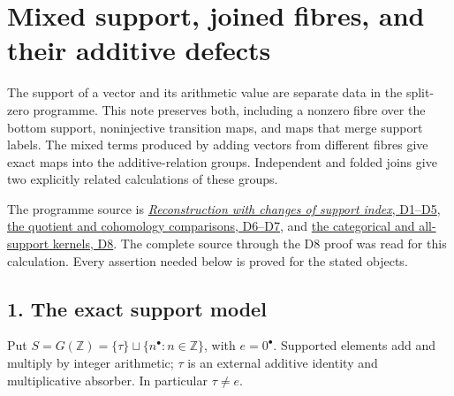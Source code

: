\documentclass[
]{article}
\author{}
\date{}
\begin{document}
{
\setcounter{tocdepth}{3}
\tableofcontents
}
\section{Mixed support, joined fibres, and their additive
defects}\label{mixed-support-joined-fibres-and-their-additive-defects}

The support of a vector and its arithmetic value are separate data in
the split-zero programme. This note preserves both, including a nonzero
fibre over the bottom support, noninjective transition maps, and maps
that merge support labels. The mixed terms produced by adding vectors
from different fibres give exact maps into the additive-relation groups.
Independent and folded joins give two explicitly related calculations of
these groups.

The programme source is
\href{https://github.com/KokunoYumeto/zeta-function-research-reader/blob/39ced92952a9c807d51500783b221beb141da3b6/workbenches/splitzero-tandem/tex/support_diagrams.tex\#L9}{\emph{Reconstruction
with changes of support index}, D1--D5},
\href{https://github.com/KokunoYumeto/zeta-function-research-reader/blob/39ced92952a9c807d51500783b221beb141da3b6/workbenches/splitzero-tandem/tex/support_diagrams.tex\#L125}{the
quotient and cohomology comparisons, D6--D7}, and
\href{https://github.com/KokunoYumeto/zeta-function-research-reader/blob/39ced92952a9c807d51500783b221beb141da3b6/workbenches/splitzero-tandem/tex/support_diagrams.tex\#L178}{the
categorical and all-support kernels, D8}. The complete source through
the D8 proof was read for this calculation. Every assertion needed below
is proved for the stated objects.

\subsection{1. The exact support model}\label{the-exact-support-model}

Put \(S=G(\mathbb Z)=\{\tau\}\sqcup\{n^\bullet:n\in\mathbb Z\}\), with
\(e=0^\bullet\). Supported elements add and multiply by integer
arithmetic; \(\tau\) is an external additive identity and multiplicative
absorber. In particular \(\tau\ne e\).
\end{document}
